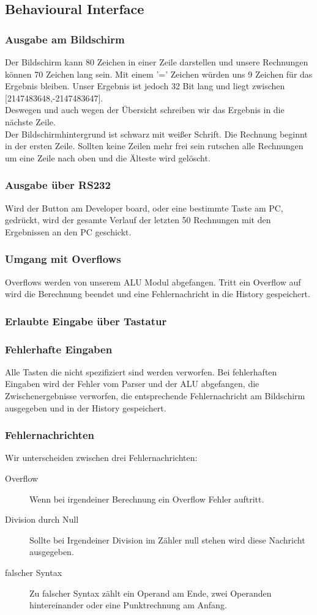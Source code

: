 \subsection{Behavioural Interface}
\subsubsection{Ausgabe am Bildschirm}
Der Bildschirm kann 80 Zeichen in einer Zeile darstellen und unsere Rechnungen können 70 Zeichen lang sein. Mit einem '=' 
Zeichen würden uns 9 Zeichen für das Ergebnis bleiben. Unser Ergebnis ist jedoch 32 Bit lang und liegt zwischen [2147483648,-2147483647].\\
Deswegen und auch wegen der Übersicht schreiben wir das Ergebnis in die nächste Zeile.\\
Der Bildschirmhintergrund ist schwarz mit weißer Schrift. Die Rechnung beginnt in der ersten Zeile. Sollten keine Zeilen mehr 
frei sein rutschen alle Rechnungen um eine Zeile nach oben und die Älteste wird gelöscht.
\subsubsection{Ausgabe über RS232}
Wird der Button am Developer board, oder eine bestimmte Taste am PC, gedrückt, wird der gesamte Verlauf der letzten 50 Rechnungen mit den Ergebnissen an den PC geschickt.
\subsubsection{Umgang mit Overflows}
Overflows werden von unserem ALU Modul abgefangen. Tritt ein Overflow auf wird die Berechnung beendet und eine Fehlernachricht in die History gespeichert.
\subsubsection{Erlaubte Eingabe über Tastatur}

\subsubsection{Fehlerhafte Eingaben}
Alle Tasten die nicht spezifiziert sind werden verworfen. Bei fehlerhaften Eingaben wird der Fehler vom Parser und der ALU abgefangen, die Zwischenergebnisse verworfen, die entsprechende Fehlernachricht am Bildschirm ausgegeben und in der History gespeichert.
\subsubsection{Fehlernachrichten}
Wir unterscheiden zwischen drei Fehlernachrichten:
\begin{description}
 \item[Overflow] Wenn bei irgendeiner Berechnung ein Overflow Fehler auftritt. 
 \item[Division durch Null] Sollte bei Irgendeiner Division im Zähler null stehen wird diese Nachricht ausgegeben.
 \item[falscher Syntax]Zu falscher Syntax zählt ein Operand am Ende, zwei Operanden hintereinander oder eine Punktrechnung am Anfang.
\end{description}


